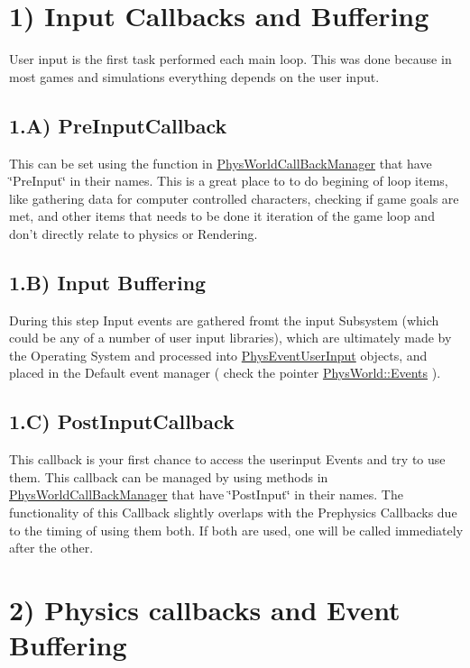  \hypertarget{mainloop1_callbacks1}{}\section{1) Input Callbacks and Buffering}\label{mainloop1_callbacks1}
User input is the first task performed each main loop. This was done because in most games and simulations everything depends on the user input. \hypertarget{mainloop1_input1}{}\subsection{1.A) PreInputCallback}\label{mainloop1_input1}
This can be set using the function in \hyperlink{classPhysWorldCallBackManager}{PhysWorldCallBackManager} that have \char`\"{}PreInput\char`\"{} in their names. This is a great place to to do begining of loop items, like gathering data for computer controlled characters, checking if game goals are met, and other items that needs to be done it iteration of the game loop and don't directly relate to physics or Rendering. \hypertarget{mainloop1_input2}{}\subsection{1.B) Input Buffering}\label{mainloop1_input2}
During this step Input events are gathered fromt the input Subsystem (which could be any of a number of user input libraries), which are ultimately made by the Operating System and processed into \hyperlink{classPhysEventUserInput}{PhysEventUserInput} objects, and placed in the Default event manager ( check the pointer \hyperlink{classPhysWorld_a601b3c6093aaf2a69fcd3311dde9aadc}{PhysWorld::Events} ). \hypertarget{mainloop1_input3}{}\subsection{1.C) PostInputCallback}\label{mainloop1_input3}
This callback is your first chance to access the userinput Events and try to use them. This callback can be managed by using methods in \hyperlink{classPhysWorldCallBackManager}{PhysWorldCallBackManager} that have \char`\"{}PostInput\char`\"{} in their names. The functionality of this Callback slightly overlaps with the Prephysics Callbacks due to the timing of using them both. If both are used, one will be called immediately after the other. \par
 \hypertarget{mainloop1_callbacks2}{}\section{2) Physics callbacks and Event Buffering}\label{mainloop1_callbacks2}
